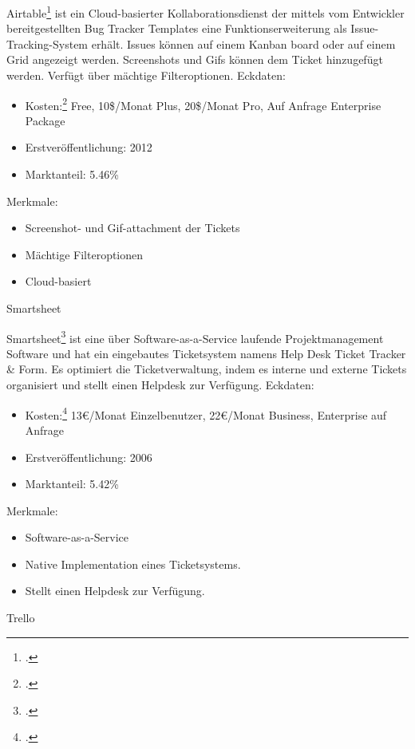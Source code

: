 Airtable\footcite{airtable} ist ein Cloud-basierter Kollaborationsdienst der mittels vom Entwickler bereitgestellten Bug Tracker Templates eine Funktionserweiterung als Issue-Tracking-System erhält. Issues können auf einem Kanban board oder auf einem Grid angezeigt werden. Screenshots und Gifs können dem Ticket hinzugefügt werden. Verfügt über mächtige Filteroptionen.	
Eckdaten:
\begin{itemize}
	\item Kosten:\footcite{airtable-pricing} Free, 10\$/Monat Plus, 20\$/Monat Pro, Auf Anfrage Enterprise Package
	\item Erstveröffentlichung: 2012 
	\item Marktanteil: 5.46\%
\end{itemize}
\newpage		
Merkmale:
\begin{itemize}
	\item Screenshot- und Gif-attachment der Tickets
	\item Mächtige Filteroptionen
	\item Cloud-basiert
\end{itemize}
Smartsheet
			
Smartsheet\footcite{smartsheet} ist eine über Software-as-a-Service laufende Projektmanagement Software und hat ein eingebautes Ticketsystem namens Help Desk Ticket Tracker \& Form. Es optimiert die Ticketverwaltung, indem es interne und externe Tickets organisiert und stellt einen Helpdesk zur Verfügung. 
Eckdaten:
\begin{itemize}
	\item Kosten:\footcite{smartsheet-pricing} 13€/Monat Einzelbenutzer, 22€/Monat Business, Enterprise auf Anfrage
	\item Erstveröffentlichung: 2006
	\item Marktanteil: 5.42\%
\end{itemize}		
Merkmale:
\begin{itemize}
	\item Software-as-a-Service
	\item Native Implementation eines Ticketsystems.
	\item Stellt einen Helpdesk zur Verfügung.
\end{itemize}
Trello

